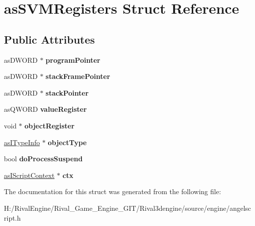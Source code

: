 \hypertarget{structas_s_v_m_registers}{}\section{as\+S\+V\+M\+Registers Struct Reference}
\label{structas_s_v_m_registers}
\subsection*{Public Attributes}
\begin{DoxyCompactItemize}
\item 
\mbox{\label{structas_s_v_m_registers_abacce81d44b2387a2b66549bcba47643}} 
as\+D\+W\+O\+RD $\ast$ {\bfseries program\+Pointer}
\item 
\mbox{\label{structas_s_v_m_registers_ab1d0ebdb2e9b1b57320ade00beaf229b}} 
as\+D\+W\+O\+RD $\ast$ {\bfseries stack\+Frame\+Pointer}
\item 
\mbox{\label{structas_s_v_m_registers_abb79cddcc4d38d286f221f2b4d323ab6}} 
as\+D\+W\+O\+RD $\ast$ {\bfseries stack\+Pointer}
\item 
\mbox{\label{structas_s_v_m_registers_aa87c457f97ce8e49fd808c8b6fd8e9d8}} 
as\+Q\+W\+O\+RD {\bfseries value\+Register}
\item 
\mbox{\label{structas_s_v_m_registers_a12e6c46db50443d8f7faeec71abf42f7}} 
void $\ast$ {\bfseries object\+Register}
\item 
\mbox{\label{structas_s_v_m_registers_a6b6463e377e4f83bb8bd7b9afb3abb02}} 
\hyperlink{classas_i_type_info}{as\+I\+Type\+Info} $\ast$ {\bfseries object\+Type}
\item 
\mbox{\label{structas_s_v_m_registers_ae1fe3cb6cbcf870cfde3364e66909e4f}} 
bool {\bfseries do\+Process\+Suspend}
\item 
\mbox{\label{structas_s_v_m_registers_aaaf2063a2786459281f9426f5083f8d1}} 
\hyperlink{classas_i_script_context}{as\+I\+Script\+Context} $\ast$ {\bfseries ctx}
\end{DoxyCompactItemize}


The documentation for this struct was generated from the following file\+:\begin{DoxyCompactItemize}
\item 
H\+:/\+Rival\+Engine/\+Rival\+\_\+\+Game\+\_\+\+Engine\+\_\+\+G\+I\+T/\+Rival3dengine/source/engine/angelscript.\+h\end{DoxyCompactItemize}
